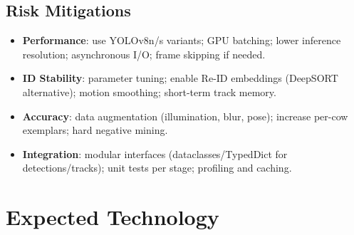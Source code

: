 \documentclass{article}
\begin{document}
\subsection*{Risk Mitigations}
\begin{itemize}
  \item \textbf{Performance}: use YOLOv8n/s variants; GPU batching; lower inference resolution; asynchronous I/O; frame skipping if needed.
  \item \textbf{ID Stability}: parameter tuning; enable Re-ID embeddings (DeepSORT alternative); motion smoothing; short-term track memory.
  \item \textbf{Accuracy}: data augmentation (illumination, blur, pose); increase per-cow exemplars; hard negative mining.
  \item \textbf{Integration}: modular interfaces (dataclasses/TypedDict for detections/tracks); unit tests per stage; profiling and caching.
\end{itemize}

\section{Expected Technology}




\end{document}
